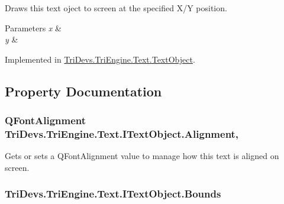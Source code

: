 Draws this text oject to screen at the specified X/\-Y position. 


\begin{DoxyParams}{Parameters}
{\em x} & \\
\hline
{\em y} & \\
\hline
\end{DoxyParams}


Implemented in \hyperlink{class_tri_devs_1_1_tri_engine_1_1_text_1_1_text_object_af36bac67ca19ddbd9a6a5d01841b5c8d}{Tri\-Devs.\-Tri\-Engine.\-Text.\-Text\-Object}.



\subsection{Property Documentation}
\hypertarget{interface_tri_devs_1_1_tri_engine_1_1_text_1_1_i_text_object_a11c5cec397c309fb33e948fecab11f61}{
\subsubsection[{Alignment}]{\setlength{\rightskip}{0pt plus 5cm}Q\-Font\-Alignment Tri\-Devs.\-Tri\-Engine.\-Text.\-I\-Text\-Object.\-Alignment\hspace{0.3cm}{\ttfamily [get]}, {\ttfamily [set]}}}\label{interface_tri_devs_1_1_tri_engine_1_1_text_1_1_i_text_object_a11c5cec397c309fb33e948fecab11f61}


Gets or sets a Q\-Font\-Alignment value to manage how this text is aligned on screen. 

\hypertarget{interface_tri_devs_1_1_tri_engine_1_1_text_1_1_i_text_object_a145c9d010de6587d761db23074b61264}{
\subsubsection[{Bounds}]{ Tri\-Devs.\-Tri\-Engine.\-Text.\-I\-Text\-Object.\-Bounds\hspace{0.3cm}{\ttfamily [get]}}}\label{interface_tri_devs_1_1_tri_engine_1_1_text_1_1_i_text_object_a145c9d010de6587d761db23074b61264}


